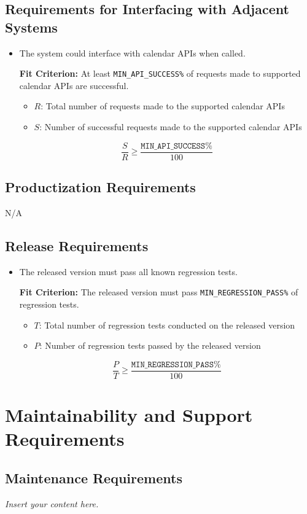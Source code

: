 \documentclass[12pt]{article}
\newcommand{\lips}{\textit{Insert your content here.}}
\newcounter{nfrnum} %
\newcommand{\rthenfrnum}{NFR\refstepcounter{nfrnum}\thenfrnum:}
\begin{document}
\subsection{Requirements for Interfacing with Adjacent Systems}
\begin{itemize}
\item[\rthenfrnum]
The system could interface with calendar APIs when called.

\textbf{Fit Criterion:} At least \texttt{MIN\_API\_SUCCESS\%} of requests made to supported calendar APIs are successful.
\begin{itemize}
    \item \( R \): Total number of requests made to the supported calendar APIs
    \item \( S \): Number of successful requests made to the supported calendar APIs
\end{itemize}
\[
    \frac{S}{R} \geq \frac{\texttt{MIN\_API\_SUCCESS\%}}{100}
\]
\end{itemize}
\subsection{Productization Requirements}
N/A
\subsection{Release Requirements}
\begin{itemize}
\item[\rthenfrnum]
The released version must pass all known regression tests.

\textbf{Fit Criterion:} The released version must pass \texttt{MIN\_REGRESSION\_PASS\%} of regression tests. 
\begin{itemize}
    \item \( T \): Total number of regression tests conducted on the released version
    \item \( P \): Number of regression tests passed by the released version
\end{itemize}
\[
    \frac{P}{T} \geq \frac{\texttt{MIN\_REGRESSION\_PASS\%}}{100}
\]
\end{itemize}
\section{Maintainability and Support Requirements}
\subsection{Maintenance Requirements}
\lips
\end{document}

